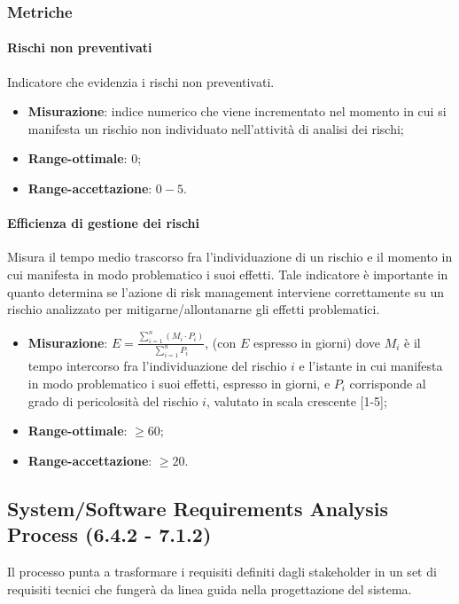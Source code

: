 \subsubsection{Metriche}
\paragraph{Rischi non preventivati}
\label{riskNonPrev}
Indicatore che evidenzia i rischi non preventivati.
\begin{itemize}
\item \textbf{Misurazione}: indice numerico che viene incrementato nel momento in cui si manifesta un rischio non individuato nell'attività di analisi dei rischi;
\item \textbf{Range-ottimale}: $0$;
\item \textbf{Range-accettazione}: $0 - 5$.
\end{itemize}
\paragraph{Efficienza di gestione dei rischi}
\label{effGestRischi}
Misura il tempo medio trascorso fra l'individuazione di un rischio e il momento in cui manifesta in modo problematico i suoi effetti. Tale indicatore è importante in quanto determina se l'azione di risk management interviene correttamente su un rischio analizzato per mitigarne/allontanarne gli effetti problematici.
\begin{itemize}
\item \textbf{Misurazione}: $E = \frac{\sum_{i=1}^{n} (M_{i} \cdot P_{i})}{\sum_{i=1}^{n} P_{i}}$, (con $E$ espresso in giorni) dove $M_{i}$ è il tempo intercorso fra l'individuazione del rischio $i$ e l'istante in cui manifesta in modo problematico i suoi effetti, espresso in giorni, e $P_{i}$ corrisponde al grado di pericolosità del rischio $i$, valutato in scala crescente [1-5];
\item \textbf{Range-ottimale}: $\geq 60$;
\item \textbf{Range-accettazione}: $\geq 20$.
\end{itemize}

\subsection{System/Software Requirements Analysis Process (6.4.2 - 7.1.2)}
\label{sySoRequiAna}
Il processo punta a trasformare i requisiti definiti dagli stakeholder in un set di requisiti tecnici che fungerà da linea guida nella progettazione del sistema.
